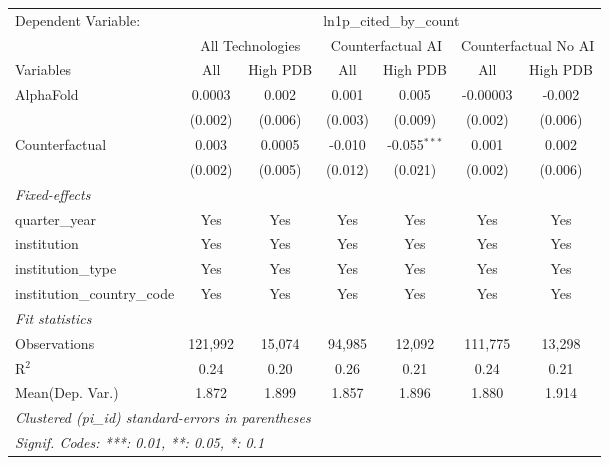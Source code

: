 \begingroup
\centering
\begin{tabular}{lcccccc}
   \tabularnewline \midrule \midrule
   Dependent Variable: & \multicolumn{6}{c}{ln1p\_cited\_by\_count}\\
 & \multicolumn{2}{c}{All Technologies} & \multicolumn{2}{c}{Counterfactual AI} & \multicolumn{2}{c}{Counterfactual No AI} \\
\cmidrule(lr){1-1}\cmidrule(lr){2-3} \cmidrule(lr){4-5} \cmidrule(lr){6-7}
Variables & \multicolumn{1}{c}{All} & \multicolumn{1}{c}{High PDB} & \multicolumn{1}{c}{All} & \multicolumn{1}{c}{High PDB} & \multicolumn{1}{c}{All} & \multicolumn{1}{c}{High PDB} \\
\cmidrule(lr){1-1}\cmidrule(lr){2-2} \cmidrule(lr){3-3} \cmidrule(lr){4-4} \cmidrule(lr){5-5} \cmidrule(lr){6-6} \cmidrule(lr){7-7}
   AlphaFold                    & 0.0003  & 0.002   & 0.001   & 0.005          & -0.00003 & -0.002\\   
                                & (0.002) & (0.006) & (0.003) & (0.009)        & (0.002)  & (0.006)\\   
   Counterfactual               & 0.003   & 0.0005  & -0.010  & -0.055$^{***}$ & 0.001    & 0.002\\   
                                & (0.002) & (0.005) & (0.012) & (0.021)        & (0.002)  & (0.006)\\   
   \midrule
   \emph{Fixed-effects}\\
   quarter\_year                & Yes     & Yes     & Yes     & Yes            & Yes      & Yes\\  
   institution                  & Yes     & Yes     & Yes     & Yes            & Yes      & Yes\\  
   institution\_type            & Yes     & Yes     & Yes     & Yes            & Yes      & Yes\\  
   institution\_country\_code   & Yes     & Yes     & Yes     & Yes            & Yes      & Yes\\  
   \midrule
   \emph{Fit statistics}\\
   Observations                 & 121,992 & 15,074  & 94,985  & 12,092         & 111,775  & 13,298\\  
   R$^2$                        & 0.24    & 0.20    & 0.26    & 0.21           & 0.24     & 0.21\\  
Mean(Dep. Var.) & 1.872 & 1.899 & 1.857 & 1.896 & 1.880 & 1.914 \\
   \midrule \midrule
   \multicolumn{7}{l}{\emph{Clustered (pi\_id) standard-errors in parentheses}}\\
   \multicolumn{7}{l}{\emph{Signif. Codes: ***: 0.01, **: 0.05, *: 0.1}}\\
\end{tabular}
\par\endgroup
